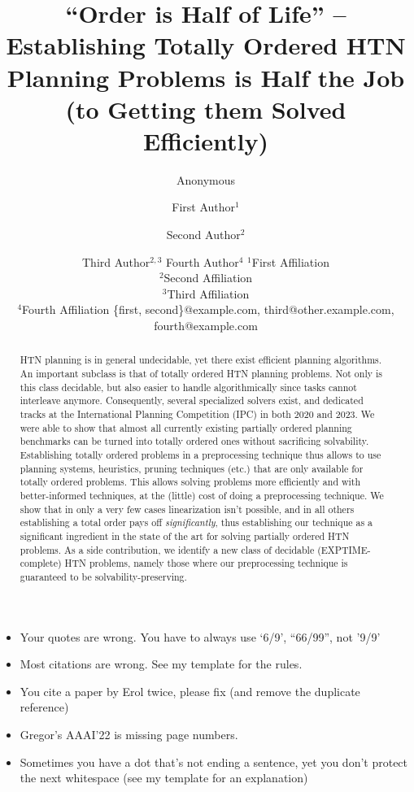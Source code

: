 \documentclass{article}
\title{``Order is Half of Life'' -- Establishing Totally Ordered HTN Planning Problems is Half the Job (to Getting them Solved Efficiently)}
\author{Anonymous}
\author{
First Author$^1$
\and
Second Author$^2$\and
Third Author$^{2,3}$\And
Fourth Author$^4$
\affiliations
$^1$First Affiliation\\
$^2$Second Affiliation\\
$^3$Third Affiliation\\
$^4$Fourth Affiliation
\emails
\{first, second\}@example.com,
third@other.example.com,
fourth@example.com
}
\begin{document}
\maketitle

\begin{abstract}
HTN planning is in general undecidable, yet there exist efficient planning algorithms. An important subclass is that of totally ordered HTN planning problems. Not only is this class decidable, but also easier to handle algorithmically since tasks cannot interleave anymore. Consequently, several specialized solvers exist, and dedicated tracks at the International Planning Competition (IPC) in both 2020 and 2023. We were able to show that almost all currently existing partially ordered planning benchmarks can be turned into totally ordered ones without sacrificing solvability. Establishing totally ordered problems in a preprocessing technique thus allows to use planning systems, heuristics, pruning techniques (etc.) that are only available for totally ordered problems. This allows solving problems more efficiently and with better-informed techniques, at the (little) cost of doing a preprocessing technique. We show that in only a very few cases linearization isn't possible, and in all others establishing a total order pays off \emph{significantly}, thus establishing our technique as a significant ingredient in the state of the art for solving partially ordered HTN problems. As a side contribution, we identify a new class of decidable (EXPTIME-complete) HTN problems, namely those where our preprocessing technique is guaranteed to be solvability-preserving.
\end{abstract}





\begin{itemize}
  \item Your quotes are wrong. You have to always use `6/9', ``66/99'', not '9/9'
  \item Most citations are wrong. See my template for the rules.
  \item You cite a paper by Erol twice, please fix (and remove the duplicate reference)
  \item Gregor's AAAI'22 is missing page numbers.
  \item Sometimes you have a dot that's not ending a sentence, yet you don't protect the next whitespace (see my template for an explanation)
\end{itemize}
\end{document}
